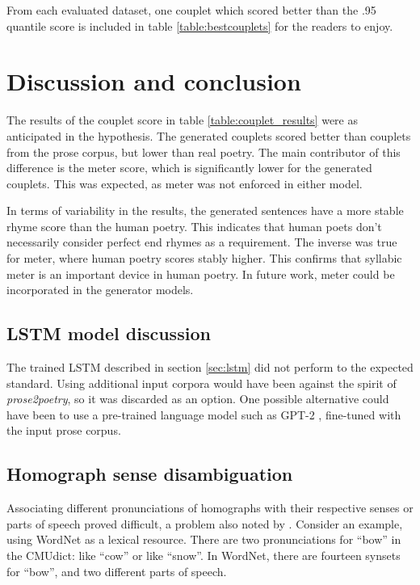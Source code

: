 \documentclass[11pt,a4paper]{article}
\begin{document}
From each evaluated dataset, one couplet which scored better than the .95 quantile score is included in table \ref{table:bestcouplets} for the readers to enjoy.

\section{Discussion and conclusion}
\label{sec:discconc}

The results of the couplet score in table \ref{table:couplet_results} were as anticipated in the hypothesis. The generated couplets scored better than couplets from the prose corpus, but lower than real poetry. The main contributor of this difference is the meter score, which is significantly lower for the generated couplets. This was expected, as meter was not enforced in either model.

In terms of variability in the results, the generated sentences have a more stable rhyme score than the human poetry. This indicates that human poets don't necessarily consider perfect end rhymes as a requirement. The inverse was true for meter, where human poetry scores stably higher. This confirms that syllabic meter is an important device in human poetry. In future work, meter could be incorporated in the generator models.

\subsection{LSTM model discussion}
\label{sec:discconclstm}

The trained LSTM described in section \ref{sec:lstm} did not perform to the expected standard. Using additional input corpora would have been against the spirit of \textit{prose2poetry}, so it was discarded as an option. One possible alternative could have been to use a pre-trained language model such as GPT-2 \cite{gpt2}, fine-tuned with the input prose corpus.

\subsection{Homograph sense disambiguation}
\label{sec:synset}

Associating different pronunciations of homographs with their respective senses or parts of speech proved difficult, a problem also noted by \citet{hopkins-kiela-2017}. Consider an example, using WordNet \cite{wordnet} as a lexical resource. There are two pronunciations for ``bow'' in the CMUdict: like ``cow'' or like ``snow''. In WordNet, there are fourteen synsets for ``bow'', and two different parts of speech.
\end{document}

